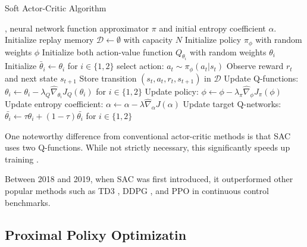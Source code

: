 \begin{algorithm}[H]
\caption{Soft Actor-Critic Algorithm}
\begin{algorithmic}[1]
, neural network function approximator $\pi$ and initial entropy coefficient $\alpha$.
\State Initialize replay memory $\mathcal{D} \leftarrow \emptyset$ with capacity $N$
\State Initialize policy $\pi_{\phi}$ with random weights $\phi$
\State Initialize both action-value function $Q_{\theta_i}$ with random weights 
$\theta_i$
\State Initialize $\bar{\theta}_{i} \leftarrow \theta_{i}$ for $i \in \{1,2\}$
\Repeat
        \State select action: $a_{t} \sim \pi_{\phi}(a_{t} | s_{t})$
        \State Observe reward $r_{t}$ and next state $s_{t+1}$
        \State Store transition $(s_{t}, a_{t}, r_{t}, s_{t+1})$ in $\mathcal{D}$
    \EndFor
        \State Update Q-functions: $\theta_{i} \gets \theta_{i} - \lambda_{Q} \hat{\nabla}_{\theta_{i}} J_{Q}(\theta_{i})$ for $i \in \{1,2\}$
        \State Update policy: $\phi \gets \phi - \lambda_{\pi} \hat{\nabla}_{\phi} J_{\pi}(\phi)$
        \State Update entropy coefficient: $\alpha \gets \alpha - \lambda \hat{\nabla}_{\alpha} J(\alpha)$
        \State Update target Q-networks: $\bar{\theta_{i}} \gets \tau\theta_{i} + (1 - \tau) \bar{\theta_{i}}$ for $i \in \{1,2\}$
    \EndFor
{}

\end{algorithmic}
\end{algorithm}

One noteworthy difference from conventional actor-critic methods is that SAC uses two Q-functions. While not strictly necessary, this significantly speeds up training \cite{haarnojaSoftActorCriticAlgorithms2019}.

Between 2018 and 2019, when SAC was first introduced, it outperformed other popular methods such as TD3 \cite{fujimotoAddressingFunctionApproximation2018}, DDPG \cite{lillicrapContinuousControlDeep2019}, and PPO \cite{schulmanProximalPolicyOptimization2017} in continuous control benchmarks.

\subsection{Proximal Polixy Optimizatin}\label{subsec:PPO}


